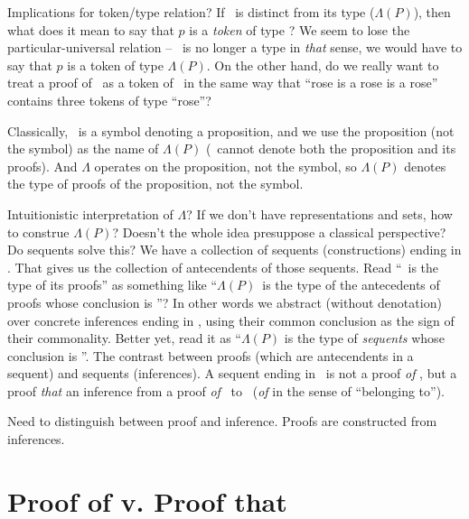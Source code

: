 \documentclass{article}
\begin{document}
\begin{remark}
Implications for token/type relation?  If \PropP\ is distinct from its
type (\(\Lambda(P)\)), then what does it mean to say that \(p\) is a
\emph{token} of type \PropP?  We seem to lose the particular-universal
relation -- \PropP\ is no longer a type in \emph{that} sense, we would
have to say that \(p\) is a token of type \(\Lambda(P)\).  On the
other hand, do we really want to treat a proof of \PropP\ as a token
of \PropP\ in the same way that ``rose is a rose is a rose'' contains
three tokens of type ``rose''?
\end{remark}

\begin{remark}
Classically, \PropP\ is a symbol
denoting a proposition, and we use the proposition (not the symbol) as
the name of \(\Lambda(P)\) (\PropP\ cannot denote both the proposition
and its proofs). And \(\Lambda\) operates on the proposition, not the
symbol, so \(\Lambda(P)\) denotes the type of proofs of the
proposition, not the symbol.
\end{remark}

\begin{remark}
Intuitionistic interpretation of \(\Lambda\)?  If we don't have
representations and sets, how to construe \(\Lambda(P)\)?  Doesn't the
whole idea presuppose a classical perspective?  Do sequents solve
this?  We have a collection of sequents (constructions) ending in
\PropP.  That gives us the collection of antecendents of those
sequents.  Read ``\PropP\ is the type of its proofs'' as something
like ``\(\Lambda(P)\)\ is the type of the antecedents of proofs whose
conclusion is \PropP''?  In other words we abstract (without
denotation) over concrete inferences ending in \PropP, using their
common conclusion as the sign of their commonality.  Better yet, read
it as ``\(\Lambda(P)\) is the type of \emph{sequents} whose conclusion
is \PropP''.  The contrast between proofs (which are antecendents in a
sequent) and sequents (inferences).  A sequent ending in \PropP\ is
not a proof \emph{of} \PropP, but a proof \emph{that} \PropP{:} an
inference from a proof \emph{of} \PropP\ to \PropP\ (\emph{of} in the
sense of ``belonging to'').
\end{remark}

\begin{remark}
Need to distinguish between proof and inference.  Proofs are
constructed from inferences.
\end{remark}

\section{Proof of v. Proof that}
\end{document}
